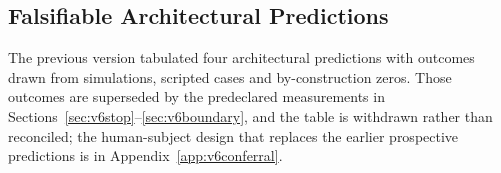 \subsection{Falsifiable Architectural Predictions}

The previous version tabulated four architectural predictions with outcomes drawn from simulations, scripted cases and
by-construction zeros. Those outcomes are superseded by the predeclared measurements in
Sections~\ref{sec:v6stop}--\ref{sec:v6boundary}, and the table is withdrawn rather than reconciled; the human-subject design that replaces the earlier prospective predictions is in
Appendix~\ref{app:v6conferral}.
